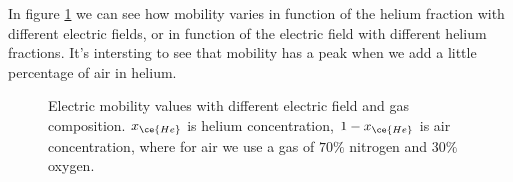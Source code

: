 In figure \ref{fig:mu} we can see how mobility varies in function of the helium fraction with different electric fields, or in function of the electric field with different helium fractions. It's intersting to see that mobility has a peak when we add a little percentage of air in helium.
\begin{figure}
 \hfill
 \caption{Electric mobility values with different electric field and gas composition. $x_{\ce{He}}$ is helium concentration, $1-x_{\ce{He}}$ is air concentration, where for air we use a gas of $70\%$ nitrogen and $30\%$ oxygen.}
 \label{fig:mu}
\end{figure}

